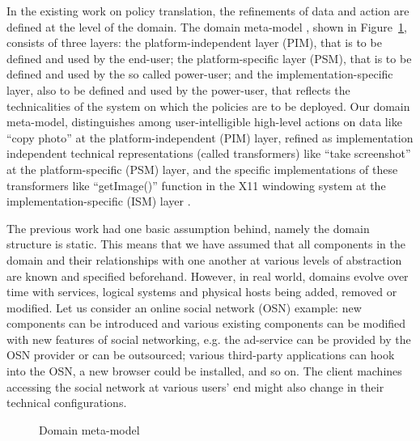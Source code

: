\documentclass{sig-alternate}
\begin{document}
In the existing work on policy translation, the refinements of data and action are defined at the level of the domain. 
The domain meta-model \cite{proceeding5}, shown in Figure~\ref{fig:metamodel}, consists of three layers:
the platform-independent layer (PIM), that is to be defined and used by the end-user;
the platform-specific layer (PSM), that is to be defined and used by the so called power-user;
and the implementation-specific layer, also to be defined and used by the power-user, that reflects the technicalities of the system on which the policies are to be deployed.
Our domain meta-model, distinguishes among user-intelligible high-level actions on data like ``copy photo'' at the platform-independent (PIM) layer,
refined as implementation independent technical representations (called transformers) like ``take screenshot'' at the platform-specific (PSM) layer,
and the specific implementations of these transformers like ``getImage()'' function in the X11 windowing system at the implementation-specific (ISM) layer \cite{proceeding4}.

The previous work had one basic assumption behind, namely the domain structure is static. 
This means that we have assumed that all components in the domain and their relationships with one another
 at various levels of abstraction are known and specified beforehand. 
However, in real world, domains evolve over time with services, logical systems and physical hosts being added, removed or modified.
Let us consider an online social network (OSN) example:
new components can be introduced and various existing components can be modified with new features of social networking, 
e.g. the ad-service can be provided by the OSN provider or can be outsourced;
various third-party applications can hook into the OSN, a new browser could be installed, and so on.
The client machines accessing the social network at various users' end might also change in their technical configurations. 

\begin{figure}
\centering
{}
\caption{Domain meta-model}
\label{fig:metamodel}
\end{figure}
\end{document}
